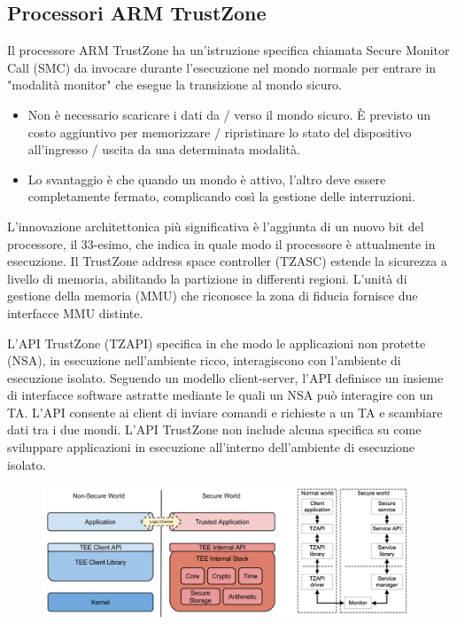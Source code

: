 \subsection{Processori ARM TrustZone}
Il processore ARM TrustZone ha un'istruzione specifica chiamata Secure
Monitor Call (SMC) da invocare durante l’esecuzione nel mondo normale per
entrare in "modalità monitor" che esegue la transizione al mondo sicuro.
\begin{itemize}
    \item Non è necessario scaricare i dati da / verso il mondo sicuro. È previsto un
costo aggiuntivo per memorizzare / ripristinare lo stato del dispositivo
all'ingresso / uscita da una determinata modalità.
    \item Lo svantaggio è che quando un mondo è attivo, l'altro deve essere
completamente fermato, complicando così la gestione delle interruzioni.
\end{itemize}
L'innovazione architettonica più significativa
è l'aggiunta di un nuovo bit del processore, il
33-esimo, che indica in quale modo il
processore è attualmente in esecuzione.
Il TrustZone address space controller (TZASC)
estende la sicurezza a livello di memoria,
abilitando la partizione in differenti regioni.
L'unità di gestione della memoria (MMU) che riconosce la zona di fiducia
fornisce due interfacce MMU distinte.

L'API TrustZone (TZAPI) specifica in che modo le applicazioni non protette
(NSA), in esecuzione nell'ambiente ricco, interagiscono con l'ambiente di
esecuzione isolato.
Seguendo un modello client-server, l'API definisce un insieme di interfacce
software astratte mediante le quali un NSA può interagire con un TA. L'API
consente ai client di inviare comandi e richieste a un TA e scambiare dati tra i
due mondi. L'API TrustZone non include alcuna specifica su come sviluppare
applicazioni in esecuzione all'interno dell'ambiente di esecuzione isolato.

\begin{figure}[htb!]
    \centering
    \includegraphics[width=11cm]{./Images/cap6/6.7.png}
\end{figure}

